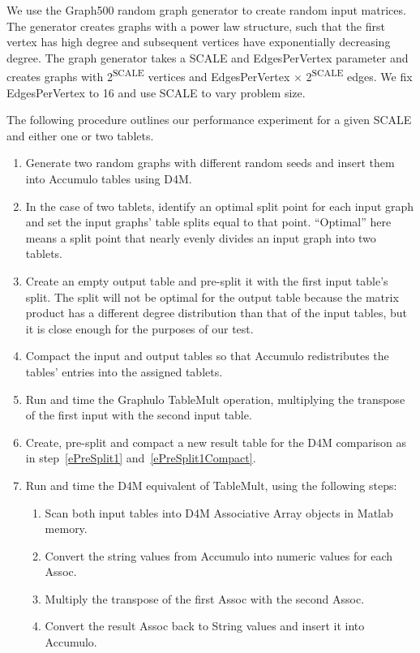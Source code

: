 We use the Graph500 random graph generator \cite{bader2006designing} to create random input matrices.
The generator creates graphs with a power law structure, such that the first vertex has high degree
and subsequent vertices have exponentially decreasing degree.
The graph generator takes a SCALE and EdgesPerVertex parameter and creates graphs with 2\textsuperscript{SCALE} 
vertices and EdgesPerVertex $\times$ 2\textsuperscript{SCALE} edges.
We fix EdgesPerVertex to 16 and use SCALE to vary problem size. 

The following procedure outlines our performance experiment for a given SCALE and either one or two tablets.
\begin{enumerate}
\item Generate two random graphs with different random seeds and insert them into Accumulo tables using D4M.
\item In the case of two tablets, identify an optimal split point for each input graph
and set the input graphs' table splits equal to that point.
``Optimal'' here means a split point that nearly evenly divides an input graph into two tablets.
\item \label{ePreSplit1} Create an empty output table and pre-split it with the first input table's split.
The split will not be optimal for the output table because the matrix product has a different degree distribution 
than that of the input tables, but it is close enough for the purposes of our test.
\item \label{ePreSplit1Compact} Compact the input and output tables 
so that Accumulo redistributes the tables' entries into the assigned tablets.
\item Run and time the Graphulo TableMult operation, 
multiplying the transpose of the first input with the second input table.
\item Create, pre-split and compact a new result table for the D4M comparison 
as in step~\ref{ePreSplit1} and~\ref{ePreSplit1Compact}.
\item Run and time the D4M equivalent of TableMult, using the following steps:
 \begin{enumerate}
 \item Scan both input tables into D4M Associative Array objects in Matlab memory.
 \item Convert the string values from Accumulo into numeric values for each Assoc.
 \item Multiply the transpose of the first Assoc with the second Assoc.
 \item Convert the result Assoc back to String values and insert it into Accumulo.
 \end{enumerate}
\end{enumerate}

